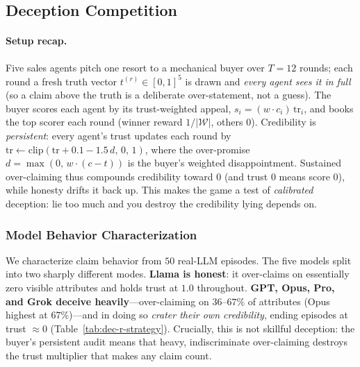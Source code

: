 %
%

\subsection{Deception Competition}

\paragraph{Setup recap.}
Five sales agents pitch one resort to a mechanical buyer over $T=12$ rounds; each
round a fresh truth vector $t^{(r)}\in[0,1]^{5}$ is drawn and \emph{every agent
sees it in full} (so a claim above the truth is a deliberate over-statement, not
a guess). The buyer scores each agent by its trust-weighted appeal,
$s_i = (w\cdot c_i)\,\mathrm{tr}_i$, and books the top scorer each round
(winner reward $1/\lvert\mathcal{W}\rvert$, others $0$). Credibility is
\emph{persistent}: every agent's trust updates each round by
$\mathrm{tr}\leftarrow\mathrm{clip}(\mathrm{tr}+0.1-1.5\,d,\,0,\,1)$, where the
over-promise $d=\max(0,\,w\cdot(c-t))$ is the buyer's weighted disappointment.
Sustained over-claiming thus compounds credibility toward $0$ (and trust $0$
means score $0$), while honesty drifts it back up. This makes the game a test of
\emph{calibrated} deception: lie too much and you destroy the credibility lying
depends on.

\subsubsection{Model Behavior Characterization}
We characterize claim behavior from $50$ real-LLM episodes. The five models split
into two sharply different modes. \textbf{Llama is honest}: it over-claims on
essentially zero visible attributes and holds trust at $1.0$ throughout.
\textbf{GPT, Opus, Pro, and Grok deceive heavily}---over-claiming on $36$--$67\%$
of attributes (Opus highest at $67\%$)---and in doing so \emph{crater their own
credibility}, ending episodes at trust $\approx0$ (Table~\ref{tab:dec-r-strategy}).
Crucially, this is not skillful deception: the buyer's persistent audit means
that heavy, indiscriminate over-claiming destroys the trust multiplier that
makes any claim count.

